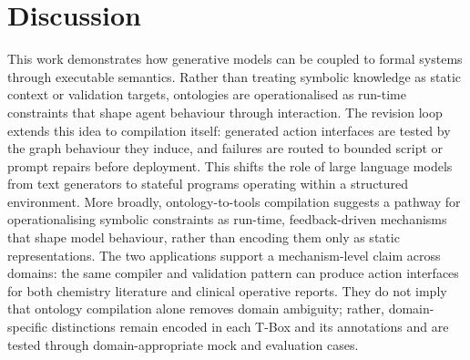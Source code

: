 \section{Discussion}\label{sec:discussion}


This work demonstrates how generative models can be coupled to formal systems through executable semantics. Rather than treating symbolic knowledge as static context or validation targets, ontologies are operationalised as run-time constraints that shape agent behaviour through interaction. The revision loop extends this idea to compilation itself: generated action interfaces are tested by the graph behaviour they induce, and failures are routed to bounded script or prompt repairs before deployment. This shifts the role of large language models from text generators to stateful programs operating within a structured environment.
%
More broadly, ontology-to-tools compilation suggests a pathway for operationalising symbolic constraints as run-time, feedback-driven mechanisms that shape model behaviour, rather than encoding them only as static representations. The two applications support a mechanism-level claim across domains: the same compiler and validation pattern can produce action interfaces for both chemistry literature and clinical operative reports. They do not imply that ontology compilation alone removes domain ambiguity; rather, domain-specific distinctions remain encoded in each T-Box and its annotations and are tested through domain-appropriate mock and evaluation cases.

